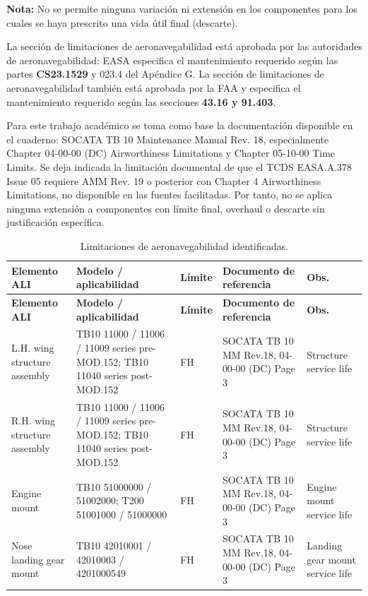 \documentclass[12pt]{article}
\newcommand{\FH}{FH}
\begin{document}
\noindent\textbf{Nota:} No se permite ninguna variación ni extensión en los componentes para los cuales se haya prescrito una vida útil final (descarte).

La sección de limitaciones de aeronavegabilidad está aprobada por las autoridades de aeronavegabilidad: EASA especifica el mantenimiento requerido según las partes \textbf{CS23.1529} y 023.4 del Apéndice G. La sección de limitaciones de aeronavegabilidad también está aprobada por la FAA y especifica el mantenimiento requerido según las secciones \textbf{43.16 y 91.403}.

Para este trabajo académico se toma como base la documentación disponible en el cuaderno: SOCATA TB 10 Maintenance Manual Rev. 18, especialmente Chapter 04-00-00 (DC) Airworthiness Limitations y Chapter 05-10-00 Time Limits. Se deja indicada la limitación documental de que el TCDS EASA.A.378 Issue 05 requiere AMM Rev. 19 o posterior con Chapter 4 Airworthiness Limitations, no disponible en las fuentes facilitadas. Por tanto, no se aplica ninguna extensión a componentes con límite final, overhaul o descarte sin justificación específica.

\begingroup
\scriptsize
\setlength{\tabcolsep}{3pt}
\renewcommand{\arraystretch}{1.18}
\begin{longtable}{|>{\raggedright\arraybackslash}p{}|>{\raggedright\arraybackslash}p{}|>{\raggedright\arraybackslash}p{}|>{\raggedright\arraybackslash}p{}|>{\raggedright\arraybackslash}p{}|}
\caption{Limitaciones de aeronavegabilidad identificadas.}
\label{tab:ali}\\
\hline
\textbf{Elemento ALI} & \textbf{Modelo / aplicabilidad} & \textbf{Límite} & \textbf{Documento de referencia} & \textbf{Obs.} \\
\hline
\endfirsthead
\hline
\textbf{Elemento ALI} & \textbf{Modelo / aplicabilidad} & \textbf{Límite} & \textbf{Documento de referencia} & \textbf{Obs.} \\
\hline
\endhead
L.H. wing structure assembly & TB10 11000 / 11006 / 11009 series pre-MOD.152; TB10 11040 series post-MOD.152 & 14600 \FH & SOCATA TB 10 MM Rev.18, 04-00-00 (DC) Page 3 & Structure service life \\
\hline
R.H. wing structure assembly & TB10 11000 / 11006 / 11009 series pre-MOD.152; TB10 11040 series post-MOD.152 & 14600 \FH & SOCATA TB 10 MM Rev.18, 04-00-00 (DC) Page 3 & Structure service life \\
\hline
Engine mount & TB10 51000000 / 51002000; T200 51001000 / 51000000 & 10000 \FH & SOCATA TB 10 MM Rev.18, 04-00-00 (DC) Page 3 & Engine mount service life \\
\hline
Nose landing gear mount & TB10 42010001 / 42010003 / 4201000549 & 10000 \FH & SOCATA TB 10 MM Rev.18, 04-00-00 (DC) Page 3 & Landing gear mount service life \\
\hline
\end{longtable}
\endgroup
\end{document}
